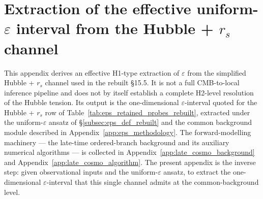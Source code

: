 %
%
%
%

\section{Extraction of the effective uniform-$\varepsilon$ interval
from the Hubble + $r_s$ channel}
\label{app:eps_extraction_hubble}

This appendix derives an effective H1-type extraction of
$\varepsilon$ from the simplified Hubble + $r_s$ channel used in the
rebuilt \S15.5. It is not a full CMB-to-local inference pipeline and
does not by itself establish a complete H2-level resolution of the
Hubble tension. Its output is the one-dimensional
$\varepsilon$-interval quoted for the Hubble + $r_s$ row of
Table~\ref{tab:eps_retained_probes_rebuilt}, extracted under the
uniform-$\varepsilon$ ansatz of \S\ref{subsec:eps_def_rebuilt} and
the common background module described in
Appendix~\ref{app:eps_methodology}. The forward-modelling machinery
--- the late-time ordered-branch background and its auxiliary
numerical algorithms --- is collected in
Appendix~\ref{app:late_cosmo_background} and
Appendix~\ref{app:late_cosmo_algorithm}. The present appendix is the
inverse step: given observational inputs and the uniform-$\varepsilon$
ansatz, to extract the one-dimensional $\varepsilon$-interval that
this single channel admits at the common-background level.

